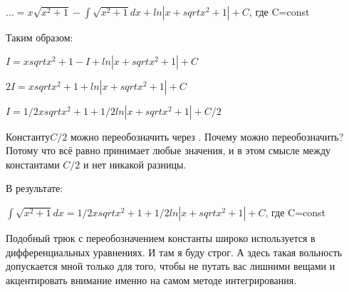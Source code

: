 \documentclass[11pt, a4paper]{article}
\begin{document}
$…=x\sqrt{x^2+1}-\int\sqrt{x^2+1}dx+ln|x+sqrt{x^2+1}|+C$, где C=const

Таким образом:

$I=xsqrt{x^2+1}-I+ln|x+sqrt{x^2+1}|+C $

$2I=xsqrt{x^2+1}+ln|x+sqrt{x^2+1}|+C $

$I=1/2 xsqrt{x^2+1}+1/2ln|x+sqrt{x^2+1}|+C /2$

Константу$ C/2 $ можно переобозначить через  . Почему можно переобозначить? Потому что   всё равно принимает любые значения, и в этом смысле между константами  $C/2$ и   нет никакой разницы.

В результате:

$\int \sqrt{x^2+1}dx=1/2 xsqrt{x^2+1}+1/2ln|x+sqrt{x^2+1}|+C$, где C=const

Подобный трюк с переобозначением константы широко используется в дифференциальных уравнениях. И там я буду строг. А здесь такая вольность допускается мной только для того, чтобы не путать вас лишними вещами и акцентировать внимание именно на самом методе интегрирования.
\end{document}
